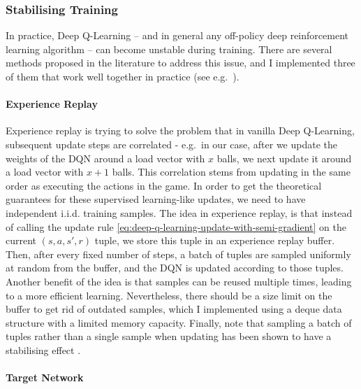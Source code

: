 \subsubsection{Stabilising Training}


In practice, Deep Q-Learning -- and in general any off-policy deep reinforcement learning algorithm -- can become unstable during training. There are several methods proposed in the literature to address this issue, and I implemented three of them that work well together in practice (see e.g.\ \cite{mnih2015dqnstabilitycombined}).


\paragraph{Experience Replay}

Experience replay \cite{lin1992experiencereplay} is trying to solve the problem that in vanilla Deep Q-Learning, subsequent update steps are correlated - e.g.\  in our case, after we update the weights of the DQN around a load vector with $x$ balls, we next update it around a load vector with $x+1$ balls. This correlation stems from updating in the same order as executing the actions in the game. In order to get the theoretical guarantees for these supervised learning-like updates, we need to have independent i.i.d. training samples. The idea in experience replay, is that instead of calling the update rule \ref{eq:deep-q-learning-update-with-semi-gradient} on the current $(s, a, s', r)$ tuple, we store this tuple in an experience replay buffer. Then, after every fixed number of steps, a batch of tuples are sampled uniformly at random from the buffer, and the DQN is updated according to those tuples. Another benefit of the idea is that samples can be reused multiple times, leading to a more efficient learning. Nevertheless, there should be a size limit on the buffer to get rid of outdated samples, which I implemented using a deque data structure with a limited memory capacity. Finally, note that sampling a batch of tuples rather than a single sample when updating has been shown to have a stabilising effect \cite{qian2020batchingsgd}.


\paragraph{Target Network}


